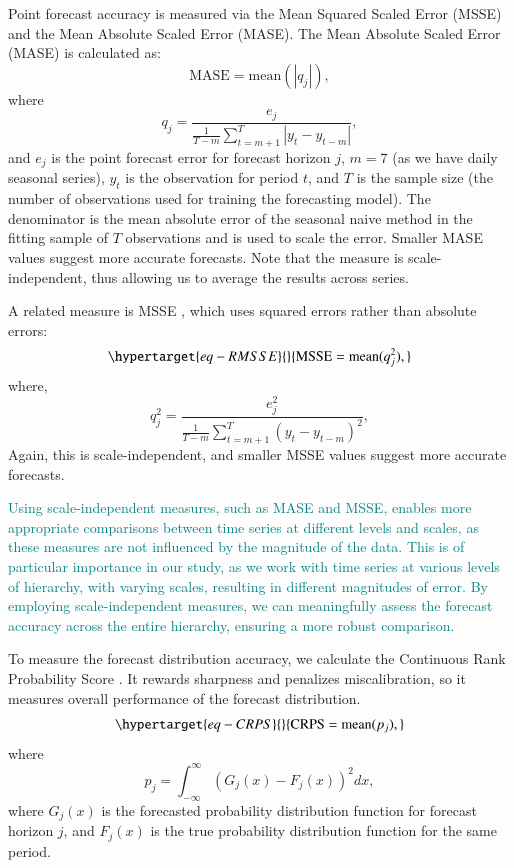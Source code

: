 \documentclass[
  authoryear,
  preprint,
  3p]{elsarticle}
\begin{document}
Point forecast accuracy is measured via the Mean Squared Scaled Error
(MSSE) and the Mean Absolute Scaled Error (MASE). The Mean Absolute
Scaled Error (MASE) \citep{HK06, hyndman2021forecasting} is calculated
as: \[
  \text{MASE} = \text{mean}(|q_{j}|),
\] where \[
  q_{j} = \frac{ e_{j}}
 {\displaystyle\frac{1}{T-m}\sum_{t=m+1}^T |y_{t}-y_{t-m}|},
\] and \(e_{j}\) is the point forecast error for forecast horizon \(j\),
\(m = 7\) (as we have daily seasonal series), \(y_t\) is the observation
for period \(t\), and \(T\) is the sample size (the number of
observations used for training the forecasting model). The denominator
is the mean absolute error of the seasonal naive method in the fitting
sample of \(T\) observations and is used to scale the error. Smaller
MASE values suggest more accurate forecasts. Note that the measure is
scale-independent, thus allowing us to average the results across
series.

A related measure is MSSE
\citep{hyndman2021forecasting, makridakis2022m5}, which uses squared
errors rather than absolute errors:
\begin{equation}\protect\hypertarget{eq-RMSSE}{}{
  \text{MSSE} = \text{mean}(q_{j}^2),
}\label{eq-RMSSE}\end{equation} where, \[
  q^2_{j} = \frac{ e^2_{j}}
 {\displaystyle\frac{1}{T-m}\sum_{t=m+1}^T (y_{t}-y_{t-m})^2},
\] Again, this is scale-independent, and smaller MSSE values suggest
more accurate forecasts.

\textcolor{teal}{Using scale-independent measures, such as MASE and MSSE, enables more appropriate comparisons between time series at different levels and scales, as these measures are not influenced by the magnitude of the data. This is of particular importance in our study, as we work with time series at various levels of hierarchy, with varying scales, resulting in different magnitudes of error. By employing scale-independent measures, we can meaningfully assess the forecast accuracy across the entire hierarchy, ensuring a more robust comparison.}

To measure the forecast distribution accuracy, we calculate the
Continuous Rank Probability Score
\citep{gneiting2014probabilistic, hyndman2021forecasting}. It rewards
sharpness and penalizes miscalibration, so it measures overall
performance of the forecast distribution.
\begin{equation}\protect\hypertarget{eq-CRPS}{}{
  \text{CRPS} = \text{mean}(p_j),
}\label{eq-CRPS}\end{equation} where \[
  p_j = \int_{-\infty}^{\infty} \left(G_j(x) - F_j(x)\right)^2dx,
\] where \(G_j(x)\) is the forecasted probability distribution function
for forecast horizon \(j\), and \(F_j(x)\) is the true probability
distribution function for the same period.
\end{document}
